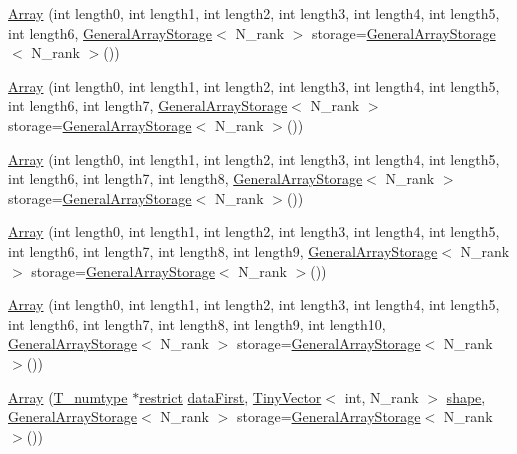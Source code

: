 \begin{DoxyCompactItemize}
\item 
\hyperlink{classArray_aac77f0608a2e3076073f4167a136cc49}{Array} (int length0, int length1, int length2, int length3, int length4, int length5, int length6, \hyperlink{classGeneralArrayStorage}{General\+Array\+Storage}$<$ N\+\_\+rank $>$ storage=\hyperlink{classGeneralArrayStorage}{General\+Array\+Storage}$<$ N\+\_\+rank $>$())
\item 
\hyperlink{classArray_af9409843b5a233a9b43e85e4b7b55ce8}{Array} (int length0, int length1, int length2, int length3, int length4, int length5, int length6, int length7, \hyperlink{classGeneralArrayStorage}{General\+Array\+Storage}$<$ N\+\_\+rank $>$ storage=\hyperlink{classGeneralArrayStorage}{General\+Array\+Storage}$<$ N\+\_\+rank $>$())
\item 
\hyperlink{classArray_a7ee46ec1e7c70e46b81aca4740ad2ee7}{Array} (int length0, int length1, int length2, int length3, int length4, int length5, int length6, int length7, int length8, \hyperlink{classGeneralArrayStorage}{General\+Array\+Storage}$<$ N\+\_\+rank $>$ storage=\hyperlink{classGeneralArrayStorage}{General\+Array\+Storage}$<$ N\+\_\+rank $>$())
\item 
\hyperlink{classArray_a9cdece0c22b465d48b178d8d34b48b90}{Array} (int length0, int length1, int length2, int length3, int length4, int length5, int length6, int length7, int length8, int length9, \hyperlink{classGeneralArrayStorage}{General\+Array\+Storage}$<$ N\+\_\+rank $>$ storage=\hyperlink{classGeneralArrayStorage}{General\+Array\+Storage}$<$ N\+\_\+rank $>$())
\item 
\hyperlink{classArray_af64c44993c0e2aa414254d507d919db5}{Array} (int length0, int length1, int length2, int length3, int length4, int length5, int length6, int length7, int length8, int length9, int length10, \hyperlink{classGeneralArrayStorage}{General\+Array\+Storage}$<$ N\+\_\+rank $>$ storage=\hyperlink{classGeneralArrayStorage}{General\+Array\+Storage}$<$ N\+\_\+rank $>$())
\item 
\hyperlink{classArray_a219a4aaab73ed4978400823ebd09e78e}{Array} (\hyperlink{classArray_ae72770f4a1d2f8b7193badafc320f008}{T\+\_\+numtype} $\ast$\hyperlink{compiler_8h_a080abdcb9c02438f1cd2bb707af25af8}{restrict} \hyperlink{classArray_a11659c9e06ad710292be467d337adc0f}{data\+First}, \hyperlink{classTinyVector}{Tiny\+Vector}$<$ int, N\+\_\+rank $>$ \hyperlink{classArray_aab2fe0a092fc7acfcdbac8e24dfc1252}{shape}, \hyperlink{classGeneralArrayStorage}{General\+Array\+Storage}$<$ N\+\_\+rank $>$ storage=\hyperlink{classGeneralArrayStorage}{General\+Array\+Storage}$<$ N\+\_\+rank $>$())

\end{DoxyCompactItemize}
